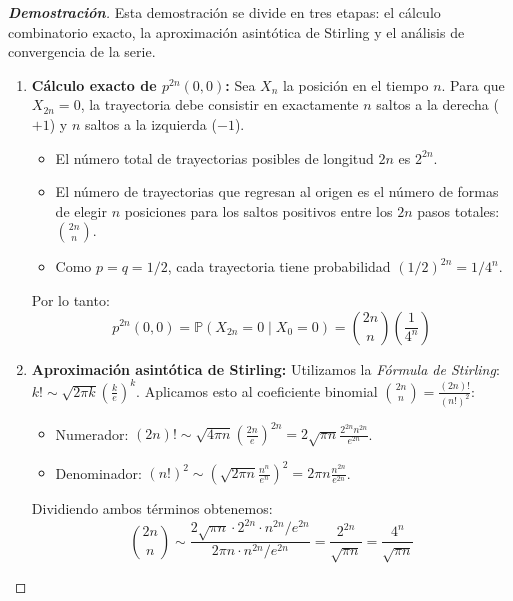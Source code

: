 \documentclass[10pt,a4paper]{article}
\begin{document}
\begin{proof}[\textbf{Demostración}]
    Esta demostración se divide en tres etapas: el cálculo combinatorio exacto, la aproximación asintótica de Stirling y el análisis de convergencia de la serie.

    \begin{enumerate}
        \item \textbf{Cálculo exacto de $p^{2n}(0,0)$:}
        Sea $X_n$ la posición en el tiempo $n$. Para que $X_{2n} = 0$, la trayectoria debe consistir en exactamente $n$ saltos a la derecha ($+1$) y $n$ saltos a la izquierda ($-1$).
        
        \begin{itemize}
            \item El número total de trayectorias posibles de longitud $2n$ es $2^{2n}$.
            \item El número de trayectorias que regresan al origen es el número de formas de elegir $n$ posiciones para los saltos positivos entre los $2n$ pasos totales: $\binom{2n}{n}$.
            \item Como $p = q = 1/2$, cada trayectoria tiene probabilidad $(1/2)^{2n} = 1/4^n$.
        \end{itemize}
        
        Por lo tanto:
        \[ p^{2n}(0,0) = \mathbb{P}(X_{2n} = 0 \mid X_0 = 0) = \binom{2n}{n} \left( \frac{1}{4^n} \right) \]

        \item \textbf{Aproximación asintótica de Stirling:}
        Utilizamos la \textit{Fórmula de Stirling}: $k! \sim \sqrt{2\pi k} \left( \frac{k}{e} \right)^k$. Aplicamos esto al coeficiente binomial $\binom{2n}{n} = \frac{(2n)!}{(n!)^2}$:
        
        \begin{itemize}
            \item Numerador: $(2n)! \sim \sqrt{4\pi n} \left( \frac{2n}{e} \right)^{2n} = 2\sqrt{\pi n} \frac{2^{2n} n^{2n}}{e^{2n}}$.
            \item Denominador: $(n!)^2 \sim \left( \sqrt{2\pi n} \frac{n^n}{e^n} \right)^2 = 2\pi n \frac{n^{2n}}{e^{2n}}$.
        \end{itemize}

        Dividiendo ambos términos obtenemos:
        \[ \binom{2n}{n} \sim \frac{2\sqrt{\pi n} \cdot 2^{2n} \cdot n^{2n} / e^{2n}}{2\pi n \cdot n^{2n} / e^{2n}} = \frac{2^{2n}}{\sqrt{\pi n}} = \frac{4^n}{\sqrt{\pi n}} \]
        

\end{enumerate}
\end{proof}
\end{document}
